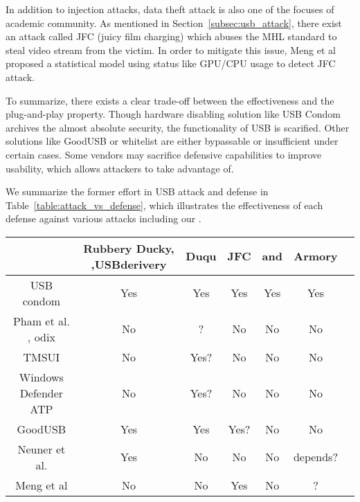 In addition to injection attacks, data theft attack is also one of the focuses of academic community. As mentioned in Section~\ref{subsec:usb_attack}, there exist an attack called JFC (juicy film charging)\cite{JFC} which abuses the MHL standard to steal video stream from the victim. In order to mitigate this issue, Meng et al proposed a statistical model using status like GPU/CPU usage to detect JFC attack\cite{meng2018252}.

To summarize, there exists a clear trade-off between the effectiveness and the plug-and-play property. Though hardware disabling solution like USB Condom archives the almost absolute security, the functionality of USB is scarified. Other solutions like GoodUSB or whitelist are either bypassable or insufficient under certain cases. 
Some vendors may sacrifice defensive capabilities to improve usability, which allows attackers to take advantage of.

We summarize the former effort in USB attack and defense in Table~\ref{table:attack_vs_defense}, which illustrates the effectiveness of each defense against various attacks including our \tool.
\begin{table*}
	\centering
	\begin{tabular}{|c|c|c|c|c|c|c|}
		
		
		\hline
		\diagbox[width=1.46in] {Defence}{Attack} & Rubbery Ducky\cite{rubber}, \cite{rubberducky2020},USBderivery\cite{usbdriver} & Duqu\cite{duqu} & JFC\cite{JFCImpact}&\cite{smartphone}\cite{poweremi} and \cite{usbdriver}& Armory\\
		
		\hline 
		USB condom \cite{Condom}& Yes & Yes & Yes & Yes & Yes\\
		\hline 
		Pham et al. \cite{pham2010optimizing}, odix\cite{OLEA}& No & ? & No & No & No\\
		\hline 
		TMSUI\cite{yang2015tmsui}& No & Yes? & No & No & No\\
		\hline 
		Windows Defender ATP\cite{windenfenderwhite}& No & Yes? & No & No & No\\
		\hline 
		GoodUSB\cite{tian2015defending}& Yes & Yes & Yes? & No & No \\

		\hline
		Neuner et al.\cite{neuner2018usblock}& Yes & No & No & No & depends? \\
		\hline
		Meng et al\cite{meng2018252}& No & No & Yes & No & ?\\
		\hline
	\end{tabular}
	\linebreak
	\caption{Effectiveness of defense against different attacks}
	\label{table:attack_vs_defense}
\end{table*}




